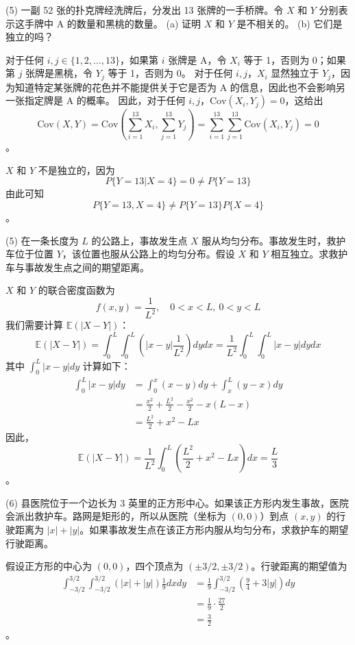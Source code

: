 \begin{questions}
\question (5) 一副 52 张的扑克牌经洗牌后，分发出 13 张牌的一手桥牌。令 $X$ 和 $Y$ 分别表示这手牌中 A 的数量和黑桃的数量。
(a) 证明 $X$ 和 $Y$ 是不相关的。
(b) 它们是独立的吗？

\begin{solution}
对于任何 $i, j \in \{1, 2, \dots, 13\}$，如果第 $i$ 张牌是 A，令 $X_i$ 等于 1，否则为 0；如果第 $j$ 张牌是黑桃，令 $Y_j$ 等于 1，否则为 0。
对于任何 $i, j$，$X_i$ 显然独立于 $Y_j$，因为知道特定某张牌的花色并不能提供关于它是否为 A 的信息，因此也不会影响另一张指定牌是 A 的概率。
因此，对于任何 $i, j$，$\text{Cov}(X_i, Y_j) = 0$，这给出
\[
\text{Cov}(X, Y) = \text{Cov}\left(\sum_{i=1}^{13} X_i, \sum_{j=1}^{13} Y_j\right) = \sum_{i=1}^{13} \sum_{j=1}^{13} \text{Cov}(X_i, Y_j) = 0
\]。

$X$ 和 $Y$ 不是独立的，因为
\[
P\{Y = 13 | X = 4\} = 0 \neq P\{Y = 13\}
\]
由此可知
\[
P\{Y = 13, X = 4\} \neq P\{Y = 13\}P\{X = 4\}
\]。
\end{solution}

\question (5) 在一条长度为 $L$ 的公路上，事故发生点 $X$ 服从均匀分布。事故发生时，救护车位于位置 $Y$，该位置也服从公路上的均匀分布。假设 $X$ 和 $Y$ 相互独立。求救护车与事故发生点之间的期望距离。

\begin{solution}
$X$ 和 $Y$ 的联合密度函数为
\[
f(x,y) = \frac{1}{L^2}, \quad 0 < x < L, \ 0 < y < L
\]
我们需要计算 $\mathbb{E}(|X - Y|)$：
\[
\mathbb{E}(|X - Y|) = \int_0^L \int_0^L \left(|x - y| \frac{1}{L^2}\right) dy dx = \frac{1}{L^2} \int_0^L \int_0^L |x - y| dy dx
\]
其中 $\int_0^L |x - y| dy$ 计算如下：
\begin{align*}
\int_0^L |x - y| dy &= \int_0^x (x - y) dy + \int_x^L (y - x) dy \\
&= \frac{x^2}{2} + \frac{L^2}{2} - \frac{x^2}{2} - x(L - x) \\
&= \frac{L^2}{2} + x^2 - Lx
\end{align*}
因此，
\[
\mathbb{E}(|X - Y|) = \frac{1}{L^2} \int_0^L \left(\frac{L^2}{2} + x^2 - Lx\right) dx = \frac{L}{3}
\]。
\end{solution}

\question (6) 县医院位于一个边长为 3 英里的正方形中心。如果该正方形内发生事故，医院会派出救护车。路网是矩形的，所以从医院（坐标为 $(0,0)$）到点 $(x,y)$ 的行驶距离为 $|x| + |y|$。如果事故发生点在该正方形内服从均匀分布，求救护车的期望行驶距离。

\begin{solution}
假设正方形的中心为 $(0,0)$，四个顶点为 $(\pm 3/2, \pm 3/2)$。行驶距离的期望值为
\begin{align*}
\int_{-3/2}^{3/2} \int_{-3/2}^{3/2} (|x| + |y|) \frac{1}{9} dx dy &= \frac{1}{9} \int_{-3/2}^{3/2} \left(\frac{9}{4} + 3|y|\right) dy \\
&= \frac{1}{9} \cdot \frac{27}{2} \\
&= \frac{3}{2}
\end{align*}。
\end{solution}


\end{questions}
